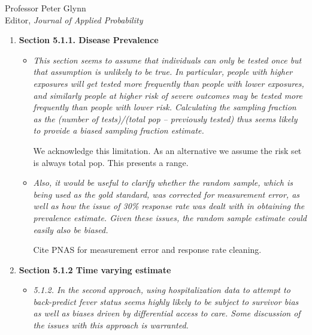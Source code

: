 \documentclass[11pt]{letter} %
\begin{document}
\begin{letter}{Professor
	Peter Glynn\\
	Editor, {\em Journal of Applied Probability}}
\begin{enumerate}
\begin{itemize}
	We provide further emphasis and evidence.  A key point is that this data is used to illustrate the 'what to do' point that was raised in the first round.
	\vspace{5mm}
\end{itemize}
\item {\bf Section 5.1.1. Disease Prevalence}
\begin{itemize}
	\item {\it This section seems to assume that individuals can only be tested once but that assumption is unlikely to be true. In particular, people with higher exposures will get tested more frequently than people with lower exposures, and similarly people at higher risk of severe outcomes may be tested more frequently than people with lower risk. Calculating the sampling fraction as the (number of tests)/(total pop – previously tested) thus seems likely to provide a biased sampling fraction estimate.}
	\vspace{5mm}

	We acknowledge this limitation.  As an alternative we assume the risk set is always total pop.  This presents a range.
	\vspace{5mm}
	\item {\it Also, it would be useful to clarify whether the random sample, which is being used as the gold standard, was corrected for measurement error, as well as how the issue of 30\% response rate was dealt with in obtaining the prevalence estimate. Given these issues, the random sample estimate could easily also be biased.}
	\vspace{5mm}

	Cite PNAS for measurement error and response rate cleaning.
	\vspace{5mm}
\end{itemize}
\item {\bf Section 5.1.2 Time varying estimate}
\begin{itemize}
	\item {\it 5.1.2. In the second approach, using hospitalization data to attempt to back-predict fever status seems highly likely to be subject to survivor bias as well as biases driven by differential access to care. Some discussion of the issues with this approach is warranted.}
	\vspace{5mm}


\end{itemize}
\end{enumerate}
\end{letter}
\end{document}
